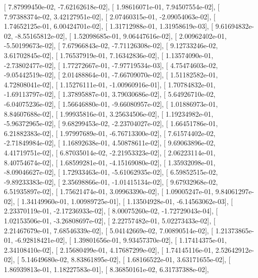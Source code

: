 \documentclass{article}
\begin{document}
       [  7.87999450e-02,  -7.62162618e-02],
       [  1.98616071e-01,   7.94507554e-02],
       [  7.97388374e-02,   3.42127951e-02],
       [  2.07460315e-01,  -2.09054063e-02],
       [  1.74652125e-01,   6.00424701e-02],
       [  1.31712988e-01,   1.31958619e-03],
       [  9.61694832e-02,  -8.55165812e-02],
       [  1.52098685e-01,   9.06447616e-02],
       [  2.00962402e-01,  -5.50199673e-02],
       [  7.67966843e-02,  -7.71126308e-02],
       [  9.12733246e-02,   3.61702845e-02],
       [  1.76537919e-01,   7.16342836e-02],
       [  1.13574090e-01,  -2.73802477e-02],
       [  1.77272667e-01,  -7.97719534e-03],
       [  4.75474603e-02,  -9.05442519e-02],
       [  2.01488864e-01,  -7.66709070e-02],
       [  1.51182582e-01,   4.72808041e-02],
       [  1.15276111e-01,  -1.00960916e-01],
       [  1.70784832e-01,  -1.69113797e-02],
       [  1.37895887e-01,   3.79030686e-02],
       [  5.64926710e-02,  -6.04075236e-02],
       [  1.56646880e-01,  -9.66080957e-02],
       [  1.01886973e-01,   8.84607688e-02],
       [  1.99935816e-01,   3.25634506e-02],
       [  1.19234982e-01,  -5.96372965e-02],
       [  9.68299453e-02,  -2.23704027e-02],
       [  1.66451786e-01,   6.21882383e-02],
       [  1.97997689e-01,  -6.76713300e-02],
       [  7.61574402e-02,  -2.71849984e-02],
       [  1.16892638e-01,   4.50878611e-02],
       [  9.69063896e-02,   4.41719751e-02],
       [  6.87035014e-02,  -2.21953323e-02],
       [  2.06223114e-01,   8.40754674e-02],
       [  1.68599281e-01,  -4.15169080e-02],
       [  1.35932098e-01,  -8.09046627e-02],
       [  1.72933463e-01,  -5.61062935e-02],
       [  6.59852515e-02,  -9.89233383e-02],
       [  2.35698866e-01,  -1.01415134e-02],
       [  9.67932968e-02,   6.51935897e-02],
       [  1.75621474e-01,   3.09963390e-02],
       [  1.09005247e-01,   9.84061297e-02],
       [  1.34149960e-01,   1.00989725e-01],
       [  1.13504928e-01,  -6.14563062e-03],
       [  2.23370119e-01,  -2.17236933e-02],
       [  8.00075260e-02,  -1.72729043e-04],
       [  1.02153506e-01,  -3.26808697e-02],
       [  2.22757482e-01,   5.02273433e-02],
       [  2.21467679e-01,   7.68546339e-02],
       [  5.04142669e-02,   7.00890514e-02],
       [  1.21373865e-01,  -6.92818421e-02],
       [  1.39801656e-01,   9.93457370e-02],
       [  1.17414375e-01,   2.34108410e-02],
       [  2.15680499e-01,   4.17687299e-02],
       [  1.74145116e-01,   2.52642912e-02],
       [  5.14649680e-02,   8.83861895e-02],
       [  1.68166522e-01,   3.63171655e-02],
       [  1.86939813e-01,   1.18227583e-01],
       [  8.36850161e-02,   6.31737388e-02],
\end{document}

